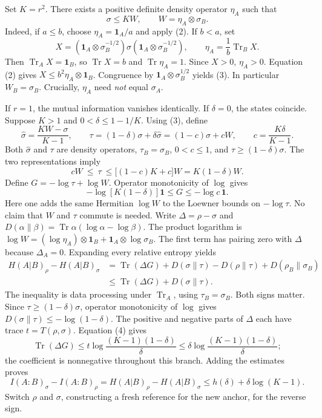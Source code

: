 \documentclass[11pt]{article}
\newcommand{\shead}[1]{\par\vspace{3pt}{\large\bfseries\sffamily\color{ink}#1}\par}
\newcommand{\Tr}{\operatorname{Tr}} \newcommand{\id}{\mathrm{id}} \newcommand{\1}{\mathbf 1}
\begin{document}
Set $K=r^2$. There exists a positive definite density operator $\eta_A$ such that
\begin{equation*}
       \sigma\le K W,\qquad W=\eta_A\otimes\sigma_B.\tag{3}
\end{equation*}
Indeed, if $a\le b$, choose $\eta_A=\1_A/a$ and apply (2). If $b<a$, set
\[
  X=(\1_A\otimes\sigma_B^{-1/2})\sigma(\1_A\otimes\sigma_B^{-1/2}),
  \qquad \eta_A=\frac1b\Tr_B X .
\]
Then $\Tr_A X=\1_B$, so $\Tr X=b$ and $\Tr\eta_A=1$. Since $X>0$, $\eta_A>0$. Equation (2) gives $X\le b^2\eta_A\otimes\1_B$. Congruence by $\1_A\otimes\sigma_B^{1/2}$ yields (3). In particular $W_B=\sigma_B$. Crucially, $\eta_A$ need \emph{not} equal $\sigma_A$.
\shead{4. The score calculation}
If $r=1$, the mutual information vanishes identically. If $\delta=0$, the states coincide. Suppose $K>1$ and $0<\delta\le1-1/K$. Using (3), define
\[
 \widehat\sigma=\frac{KW-\sigma}{K-1},\qquad
 \tau=(1-\delta)\sigma+\delta\widehat\sigma=(1-c)\sigma+cW,\qquad c=\frac{K\delta}{K-1}.
\]
Both $\widehat\sigma$ and $\tau$ are density operators, $\tau_B=\sigma_B$, $0<c\le1$, and $\tau\ge(1-\delta)\sigma$. The two representations imply
\[
        cW\ \le\ \tau\ \le\bigl[(1-c)K+c\bigr]W=K(1-\delta)W .
\]
Define $G=-\log\tau+\log W$. Operator monotonicity of $\log$ gives
\begin{equation*}
 -\log[K(1-\delta)]\1\le G\le-\log c\,\1.\tag{4}
\end{equation*}
Here one adds the same Hermitian $\log W$ to the Loewner bounds on $-\log\tau$. No claim that $W$ and $\tau$ commute is needed.
\newpage
Write $\Delta=\rho-\sigma$ and $D(\alpha\|\beta)=\Tr\alpha(\log\alpha-\log\beta)$. The product logarithm is $\log W=(\log\eta_A)\otimes\1_B+\1_A\otimes\log\sigma_B$. The first term has pairing zero with $\Delta$ because $\Delta_A=0$. Expanding every relative entropy yields
\begin{align*}
 H(A|B)_\rho-H(A|B)_\sigma
 &=\Tr(\Delta G)+D(\sigma\|\tau)-D(\rho\|\tau)+D(\rho_B\|\sigma_B)\\
 &\le\Tr(\Delta G)+D(\sigma\|\tau).
\end{align*}
The inequality is data processing under $\Tr_A$, using $\tau_B=\sigma_B$. Both signs matter. Since $\tau\ge (1-\delta)\sigma$, operator monotonicity of $\log$ gives $D(\sigma\|\tau)\le-\log(1-\delta)$. The positive and negative parts of $\Delta$ each have trace $t=T(\rho,\sigma)$. Equation (4) gives
\[
 \Tr(\Delta G)\le t\log\frac{(K-1)(1-\delta)}{\delta}
                 \le \delta\log\frac{(K-1)(1-\delta)}{\delta};
\]
the coefficient is nonnegative throughout this branch. Adding the estimates proves
\[
 I(A:B)_\sigma-I(A:B)_\rho
 =H(A|B)_\rho-H(A|B)_\sigma
 \le h(\delta)+\delta\log(K-1).
\]
Switch $\rho$ and $\sigma$, constructing a fresh reference for the new anchor, for the reverse sign.
\end{document}
